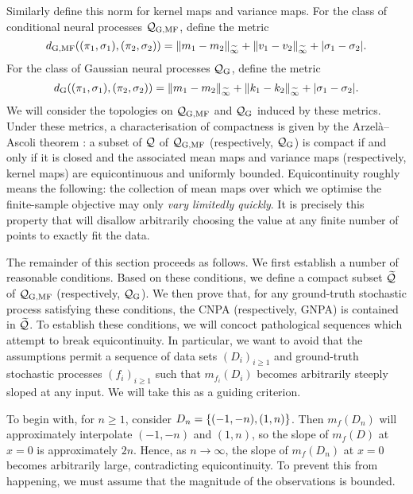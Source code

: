 \documentclass[12pt, twoside]{report}
\begin{document}
Similarly define this norm for kernel maps and variance maps.
For the class of conditional neural processes $\Qc\ss{G,MF}$, define the metric
\begin{equation} \label{eq:metric_Q_G_MF}
    d\ss{G,MF}((\pi_1, \sigma_1), (\pi_2, \sigma_2))
    = \norm{m_{1} - m_{2}}_{\widetilde\infty}
    + \norm{v_{1} - v_{2}}_{\widetilde\infty}
    + \abs{\sigma_1 - \sigma_2}.
\end{equation}
For the class of Gaussian neural processes $\Qc\ss{G}$, define the metric
\begin{equation} \label{eq:metric_Q_G}
    d\ss{G}((\pi_1, \sigma_1), (\pi_2, \sigma_2))
    = \norm{m_{1} - m_{2}}_{\widetilde\infty}
    + \norm{k_{1} - k_{2}}_{\widetilde\infty}
    + \abs{\sigma_1 - \sigma_2}.
\end{equation}
We will consider the topologies on $\Qc\ss{G,MF}$ and $\Qc\ss{G}$ induced by these metrics.
Under these metrics, a characterisation of compactness is given by the Arzel\`a--Ascoli theorem \parencite[Theorem 7.25;][]{Rudin:1976:Principles_of_Mathematical_Analysis}:
 a subset of $\mathcal{Q}$ of $\Qc\ss{G,MF}$ (respectively, $\Qc\ss{G}$) is compact if and only if it is closed and the associated mean maps and variance maps (respectively, kernel maps) are equicontinuous and uniformly bounded. 
Equicontinuity roughly means the following:
the collection of mean maps over which we optimise the finite-sample objective may only \emph{vary limitedly quickly}.
It is precisely this property that will disallow arbitrarily choosing the value at any finite number of points to exactly fit the data.

The remainder of this section proceeds as follows.
We first establish a number of reasonable conditions.
Based on these conditions, we define a compact subset $\widetilde{\mathcal{Q}}$ of $\Qc\ss{G,MF}$ (respectively, $\Qc\ss{G}$).
We then prove that, for any ground-truth stochastic process satisfying these conditions, the CNPA (respectively, GNPA) is contained in $\widetilde{\mathcal{Q}}$.
To establish these conditions, we will concoct pathological sequences which attempt to break equicontinuity.
In particular,
we want to avoid that the assumptions permit a sequence of data sets $(D_i)_{i \ge 1}$ and ground-truth stochastic processes $(f_i)_{i \ge 1}$ such that $m_{f_i}(D_i)$ becomes arbitrarily steeply sloped at any input.
We will take this as a guiding criterion. 

To begin with, for $n \ge 1$, consider $D_n = \{(-1, -n), (1, n)\}$.
Then $m_f(D_n)$ will approximately interpolate $(-1, -n)$ and $(1, n)$, so the slope of $m_f(D)$ at $x = 0$ is approximately $2n$.
Hence, as $n \to \infty$, the slope of $m_f(D_n)$ at $x = 0$ becomes arbitrarily large, contradicting equicontinuity.
To prevent this from happening, we must assume that the magnitude of the observations is bounded.
 
\end{document}
